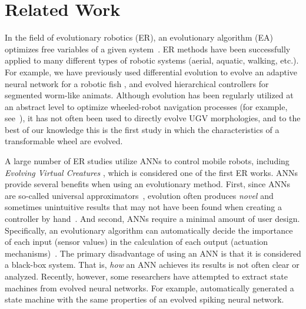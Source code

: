 \section{Related Work}
\label{sec:related-work}



In the field of evolutionary robotics (ER), an evolutionary algorithm (EA) optimizes free variables of a given system~\citep{Silva.EvolComp.Issues-ER.2016}.
%
ER methods have been successfully applied to many different types of robotic systems (aerial, aquatic, walking, etc.).
%
For example, we have previously used differential evolution to evolve an adaptive neural network for a robotic fish \citep{Clark.GECCO.MFAC.2015}, and \citet{Moore.2017.GECCO.Animat} evolved hierarchical controllers for segmented worm-like animats.
%
Although evolution has been regularly utilized at an abstract level to optimize wheeled-robot navigation processes (for example, see~\citet{Gomes.2015.GECCO.Maze}), it has not often been used to directly evolve UGV morphologies, and to the best of our knowledge this is the first study in which the characteristics of a transformable wheel are evolved.
%


A large number of ER studies utilize ANNs to control mobile robots, including \emph{Evolving Virtual Creatures} \citep{Sims.1994.CGIT.Creatures}, which is considered one of the first ER works.
%
ANNs  provide several benefits when using an evolutionary method.
%
First, since ANNs are so-called universal approximators~\citep{Hornik.1989.NN.UniversalANN}, evolution often produces \emph{novel} and sometimes unintuitive results that may not have been found when creating a controller by hand~\citep{Bongard.2013.CACM.ER}.
%
And second, ANNs require a minimal amount of user design. Specifically, an evolutionary algorithm can automatically decide the importance of each input (sensor values) in the calculation of each output (actuation mechanisms)~\citep{Stanley.2002.EC.NEAT}.
%
The primary disadvantage of using an ANN is that it is considered a black-box system. That is, \emph{how} an ANN achieves its results is not often clear or analyzed.
%
Recently, however, some researchers have attempted to extract state machines from evolved neural networks.
%
For example, \citet{Wrobel.2017.SSCI.VSSNN} automatically generated a state machine with the same properties of an evolved spiking neural network.
